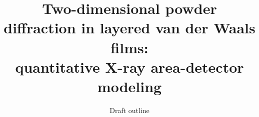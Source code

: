 \documentclass[12pt]{article}
\begin{document}
\title{Two-dimensional powder diffraction in layered van der Waals films:\\
quantitative X-ray area-detector modeling}
\author{Draft outline}
\maketitle











\end{document}
